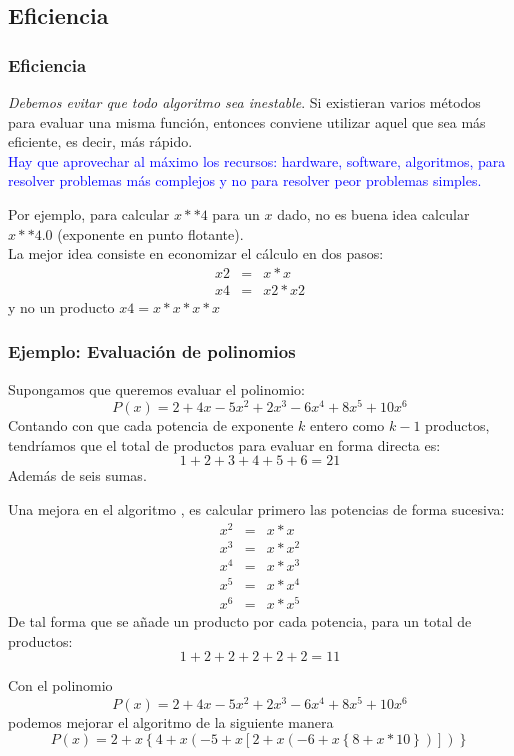 \subsection{Eficiencia}
\begin{frame}
\frametitle{Eficiencia}
\emph{Debemos evitar que todo algoritmo sea inestable}. Si existieran varios métodos para evaluar una misma función, entonces conviene utilizar aquel que sea más eficiente, es decir, más rápido.
\\
\bigskip
\pause
\textcolor{blue}{Hay que aprovechar al máximo los recursos: hardware, software, algoritmos, para resolver problemas más complejos y no para resolver peor problemas simples.}
\end{frame}
\begin{frame}
Por ejemplo, para calcular $x**4$ para un $x$ dado, no es buena idea calcular $x**4.0$ (exponente en punto flotante).
\\
\bigskip
La mejor idea consiste en economizar el cálculo en dos pasos:
\begin{eqnarray*}
x2 &=& x*x \\
x4 &=& x2*x2
\end{eqnarray*}
y no un producto $x4=x*x*x*x$
\end{frame}
\begin{frame}
\frametitle{Ejemplo: Evaluación de polinomios}
Supongamos que queremos evaluar el polinomio:
\[ P(x) = 2 + 4x - 5 x^{2} + 2 x^{3} - 6 x^{4} + 8 x^{5} + 10 x^{6}\]
Contando con que cada potencia de exponente $k$ entero como $k-1$ productos, tendríamos que el total de productos para evaluar en forma directa es:
\[ 1+2+3+4+5+6=21\]
Además de seis sumas.
\end{frame}
\begin{frame}
Una mejora en el algoritmo , es calcular primero las potencias de forma sucesiva:
\begin{eqnarray*}
x^{2} & = & x*x \\
x^{3} & = & x*x^{2} \\
x^{4} & = & x*x^{3} \\
x^{5} & = & x*x^{4} \\
x^{6} & = & x*x^{5}
\end{eqnarray*}
De tal forma que se añade un producto por cada potencia, para un total de productos:
\[1+2+2+2+2+2=11\]
\end{frame}
\begin{frame}
Con el polinomio
\[ P(x)=2 + 4 x - 5 x^{2} + 2 x^{3} - 6 x^{4} + 8 x^{5} + 10 x^{6}\]
podemos mejorar el algoritmo de la siguiente manera
\fontsize{12}{12}\selectfont
\[ P(x) = 2 + x \left\lbrace 4 + x \left( -5 + x \left[ 2 + x \left(-6 +x \left\lbrace 8+x*10 \right\rbrace \right) \right] \right) \right\rbrace  \]
\end{frame}

